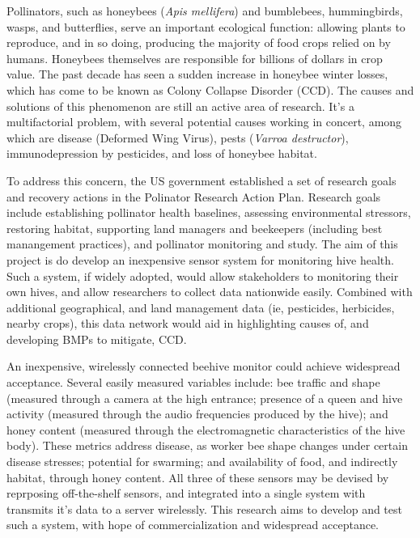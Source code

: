 


Pollinators, such as honeybees (\textit{Apis mellifera}) and bumblebees, hummingbirds, wasps, and butterflies, serve an important ecological function: allowing plants to reproduce, and in so doing, producing the majority of food crops relied on by humans. Honeybees themselves are responsible for billions of dollars in crop value. The past decade has seen a sudden increase in honeybee winter losses, which has come to be known as Colony Collapse Disorder (CCD). The causes and solutions of this phenomenon are still an active area of research. It's a multifactorial problem, with several potential causes working in concert, among which are disease (Deformed Wing Virus), pests (\textit{Varroa destructor}), immunodepression by pesticides, and loss of honeybee habitat.

To address this concern, the US government established a set of research goals and recovery actions in the Polinator Research Action Plan. Research goals include establishing pollinator health baselines, assessing environmental stressors, restoring habitat, supporting land managers and beekeepers (including best manangement practices), and pollinator monitoring and study. The aim of this project is do develop an inexpensive sensor system for monitoring hive health. Such a system, if widely adopted, would allow stakeholders to monitoring their own hives, and allow researchers to collect data nationwide easily. Combined with additional geographical, and land management data (ie, pesticides, herbicides, nearby crops), this data network would aid in highlighting causes of, and developing BMPs to mitigate, CCD.

An inexpensive, wirelessly connected beehive monitor could achieve widespread acceptance. Several easily measured variables include: bee traffic and shape (measured through a camera at the high entrance; presence of a queen and hive activity (measured through the audio frequencies produced by the hive); and honey content (measured through the electromagnetic characteristics of the hive body). These metrics address disease, as worker bee shape changes under certain disease stresses; potential for swarming; and availability of food, and indirectly habitat, through honey content. All three of these sensors may be devised by reprposing off-the-shelf sensors, and integrated into a single system with transmits it's data to a server wirelessly. This research aims to develop and test such a system, with hope of commercialization and widespread acceptance.
